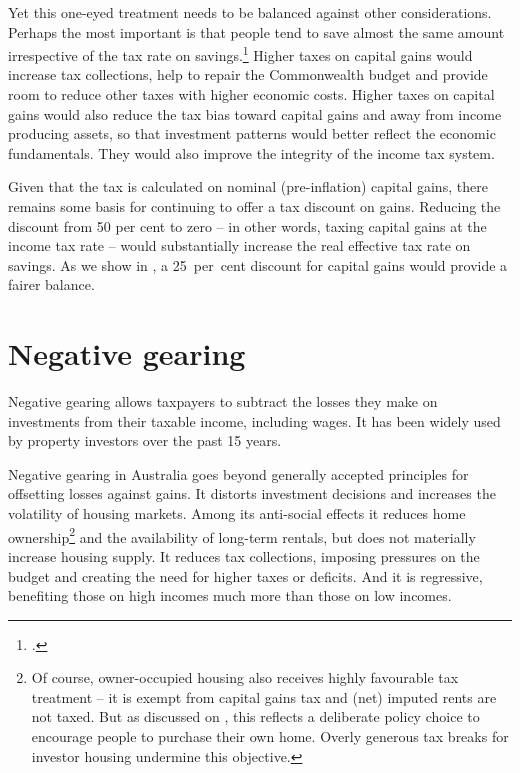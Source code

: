 \documentclass{grattanAlpha}\usepackage[]{graphicx}\usepackage[]{color}
\begin{document}
Yet this one-eyed treatment needs to be balanced against other considerations. Perhaps the most important is that people tend to save almost the same amount irrespective of the tax rate on savings.\footcite[][21]{Ingles2015} Higher taxes on capital gains would increase tax collections, help to repair the Commonwealth budget and provide room to reduce other taxes with higher economic costs. Higher taxes on capital gains would also reduce the tax bias toward capital gains and away from income producing assets, so that investment patterns would better reflect the economic fundamentals. They would also improve the integrity of the income tax system. 

Given that the tax is calculated on nominal (pre-inflation) capital gains, there remains some basis for continuing to offer a tax discount on gains. Reducing the discount from 50 per cent to zero -- in other words, taxing capital gains at the income tax rate – would substantially increase the real effective tax rate on savings. As we show in , a 25~per~cent discount for capital gains would provide a fairer balance.

\chapter{Negative gearing}
Negative gearing allows taxpayers to subtract the losses they make on investments from their taxable income, including wages. It has been widely used by property investors over the past 15 years. 

Negative gearing in Australia goes beyond generally accepted principles for offsetting losses against gains. It distorts investment decisions and increases the volatility of housing markets. Among its anti-social effects it reduces home ownership\footnote{Of course, owner-occupied housing also receives highly favourable tax treatment – it is exempt from capital gains tax and (net) imputed rents are not taxed. But as discussed on , this reflects a deliberate policy choice to encourage people to purchase their own home. Overly generous tax breaks for investor housing undermine this objective.} and the availability of long-term rentals, but does not materially increase housing supply. It reduces tax collections, imposing pressures on the budget and creating the need for higher taxes or deficits. And it is regressive, benefiting those on high incomes much more than those on low incomes.
\end{document}
